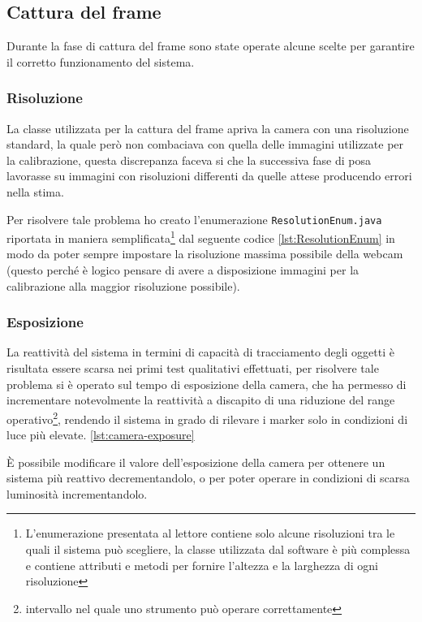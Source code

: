 \documentclass[12pt,a4paper,openright,twoside]{book}
\begin{document}
\subsection{Cattura del frame} \label{subsec:cattura_del_frame}
Durante la fase di cattura del frame sono state operate alcune scelte per garantire il corretto funzionamento del sistema.
\subsubsection{Risoluzione}
La classe utilizzata per la cattura del frame apriva la camera con una risoluzione standard, la quale però non combaciava con quella delle immagini utilizzate per la calibrazione, questa discrepanza faceva si che la successiva fase di posa lavorasse su immagini con risoluzioni differenti da quelle attese producendo errori nella stima.

Per risolvere tale problema ho creato l'enumerazione \texttt{ResolutionEnum.java} riportata in maniera semplificata\footnote{L'enumerazione presentata al lettore contiene solo alcune risoluzioni tra le quali il sistema può scegliere, la classe utilizzata dal software è più complessa e contiene attributi e metodi per fornire l'altezza e la larghezza di ogni risoluzione} dal seguente codice \cref{lst:ResolutionEnum} in modo da poter sempre impostare la risoluzione massima possibile della webcam (questo perché è logico pensare di avere a disposizione immagini per la calibrazione alla maggior risoluzione possibile).

\subsubsection{Esposizione}
La reattività del sistema in termini di capacità di tracciamento degli oggetti è risultata essere scarsa nei primi test qualitativi effettuati, per risolvere tale problema si è operato sul tempo di esposizione della camera, che ha permesso di incrementare notevolmente la reattività a discapito di una riduzione del range operativo\footnote{intervallo nel quale uno strumento può operare correttamente}, rendendo il sistema in grado di rilevare i marker solo in condizioni di luce più elevate. \cref{lst:camera-exposure}


È possibile modificare il valore dell'esposizione della camera per ottenere un sistema più reattivo decrementandolo, o per poter operare in condizioni di scarsa luminosità incrementandolo.
\end{document}
